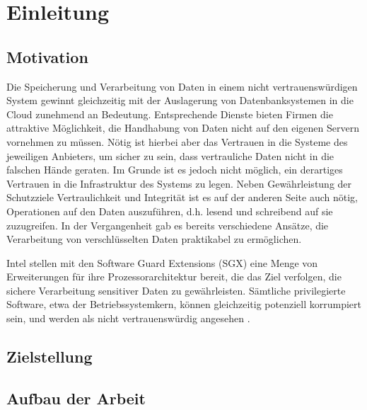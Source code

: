 
\chapter{Einleitung}

\section{Motivation}
Die Speicherung und Verarbeitung von Daten in einem nicht vertrauenswürdigen System gewinnt gleichzeitig mit der Auslagerung von Datenbanksystemen in die Cloud zunehmend an Bedeutung. Entsprechende Dienste bieten Firmen die attraktive Möglichkeit, die Handhabung von Daten nicht auf den eigenen Servern vornehmen zu müssen. Nötig ist hierbei aber das Vertrauen in die Systeme des jeweiligen Anbieters, um sicher zu sein, dass vertrauliche Daten nicht in die falschen Hände geraten. Im Grunde ist es jedoch nicht möglich, ein derartiges Vertrauen in die Infrastruktur des Systems zu legen. 
Neben Gewährleistung der Schutzziele Vertraulichkeit und Integrität ist es auf der anderen Seite auch nötig, Operationen auf den Daten auszuführen, d.h. lesend und schreibend auf sie zuzugreifen. In der Vergangenheit gab es bereits verschiedene Ansätze, die Verarbeitung von verschlüsselten Daten praktikabel zu ermöglichen.
 
Intel stellen mit den Software Guard Extensions (SGX) eine Menge von Erweiterungen für ihre Prozessorarchitektur bereit, die das Ziel verfolgen, die sichere Verarbeitung sensitiver Daten zu gewährleisten. Sämtliche privilegierte Software, etwa der Betriebssystemkern, können gleichzeitig potenziell korrumpiert sein, und werden als nicht vertrauenswürdig angesehen \cite{Costan2016}.

\section{Zielstellung}

\section{Aufbau der Arbeit}